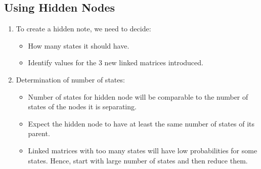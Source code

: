\documentclass[12pt,twoside]{article}
\begin{document}
\subsection{Using Hidden Nodes}

\begin{enumerate}
\item To create a hidden note, we need to decide:
	\begin{itemize}
		\item How many states it should have.
		\item Identify values for the 3 new linked matrices introduced.
	\end{itemize}

\item Determination of number of states:
	\begin{itemize}
		\item Number of states for hidden node will be comparable to the number of states of the nodes it is separating.
		\item Expect the hidden node to have at least the same number of states of its parent.
		\item Linked matrices with too many states will have low probabilities for some states. Hence, start with large number of states and then reduce them.
	\end{itemize}


\end{enumerate}
\end{document}
